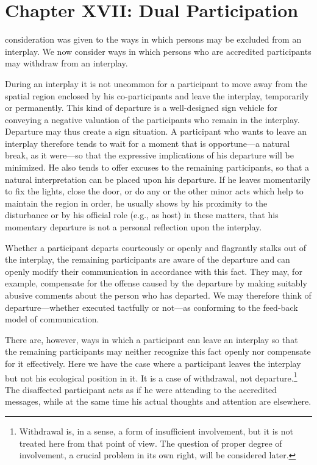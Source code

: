 \documentclass[twoside,symmetric,nobib,justified]{tufte-book}
\let\oldchapter\chapter
\def\chapter{%
  \setcounter{footnote}{0}%
  \oldchapter
}
\begin{document}
\chapter[CHAPTER XVII: DUAL PARTICIPATION]{Chapter XVII: Dual Participation}
\label{ch:Chapter XVII: Dual Participation}

 consideration was given to the ways in which
persons may be excluded from an interplay. We now consider ways in which
persons who are accredited participants may withdraw from an interplay.

During an interplay it is not uncommon for a participant to move away
from the spatial region enclosed by his co-participants and leave the
interplay, temporarily or permanently. This kind of departure is a
well-designed sign vehicle for conveying a negative valuation of the
participants who remain in the interplay. Departure may thus create a
sign situation. A participant who wants to leave an interplay therefore
tends to wait for a moment that is opportune---a natural break, as it
were---so that the expressive implications of his departure will be
minimized. He also tends to offer excuses to the remaining participants,
so that a natural interpretation can be placed upon his departure. If he
leaves momentarily to fix the lights, close the door, or do any or the
other minor acts which help to maintain the region in order, he usually
shows by his proximity to the disturbance or by his official role (e.g.,
as host) in these matters, that his momentary departure is not a
personal reflection upon the interplay.

Whether a participant departs courteously or openly and flagrantly
stalks out of the interplay, the remaining participants are aware of the
departure and can openly modify their communication in accordance with
this fact. They may, for example, compensate for the offense caused by
the departure by making suitably abusive comments about the person who
has departed. We may therefore think of departure---whether executed
tactfully or not---as conforming to the feed-back model of
communication.

There are, however, ways in which a participant can leave an interplay
so that the remaining participants may neither recognize this fact
openly nor compensate for it effectively. Here we have the case where a
participant leaves the interplay but not his ecological position in it.
It is a case of withdrawal, not departure.\footnote{Withdrawal is, in a
  sense, a form of insufficient involvement, but it is not treated here
  from that point of view. The question of proper degree of involvement,
  a crucial problem in its own right, will be considered later.} The
disaffected participant acts as if he were attending to the accredited
messages, while at the same time his actual thoughts and attention are
elsewhere.
\end{document}
